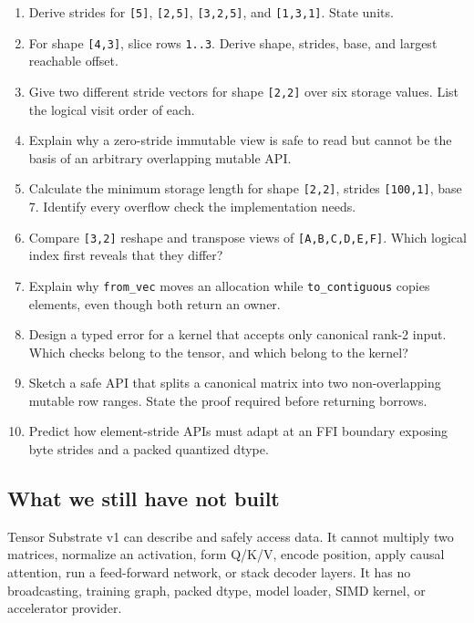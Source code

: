 \documentclass[
  10pt,
]{article}
\providecommand{\tightlist}{%
  \setlength{\itemsep}{0pt}\setlength{\parskip}{0pt}}
\begin{document}
\begin{enumerate}
\def\labelenumi{\arabic{enumi}.}
\tightlist
\item
  Derive strides for \texttt{{[}5{]}}, \texttt{{[}2,5{]}},
  \texttt{{[}3,2,5{]}}, and \texttt{{[}1,3,1{]}}. State units.
\item
  For shape \texttt{{[}4,3{]}}, slice rows \texttt{1..3}. Derive shape,
  strides, base, and largest reachable offset.
\item
  Give two different stride vectors for shape \texttt{{[}2,2{]}} over
  six storage values. List the logical visit order of each.
\item
  Explain why a zero-stride immutable view is safe to read but cannot be
  the basis of an arbitrary overlapping mutable API.
\item
  Calculate the minimum storage length for shape \texttt{{[}2,2{]}},
  strides \texttt{{[}100,1{]}}, base 7. Identify every overflow check
  the implementation needs.
\item
  Compare \texttt{{[}3,2{]}} reshape and transpose views of
  \texttt{{[}A,B,C,D,E,F{]}}. Which logical index first reveals that
  they differ?
\item
  Explain why \texttt{from\_vec} moves an allocation while
  \texttt{to\_contiguous} copies elements, even though both return an
  owner.
\item
  Design a typed error for a kernel that accepts only canonical rank-2
  input. Which checks belong to the tensor, and which belong to the
  kernel?
\item
  Sketch a safe API that splits a canonical matrix into two
  non-overlapping mutable row ranges. State the proof required before
  returning borrows.
\item
  Predict how element-stride APIs must adapt at an FFI boundary exposing
  byte strides and a packed quantized dtype.
\end{enumerate}

\subsection{What we still have not
built}\label{what-we-still-have-not-built}

Tensor Substrate v1 can describe and safely access data. It cannot
multiply two matrices, normalize an activation, form Q/K/V, encode
position, apply causal attention, run a feed-forward network, or stack
decoder layers. It has no broadcasting, training graph, packed dtype,
model loader, SIMD kernel, or accelerator provider.
\end{document}

